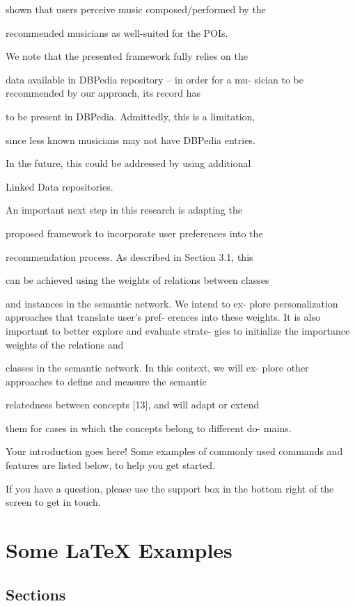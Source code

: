 \documentclass[paper=a4, fontsize=11pt]{scrartcl}
\begin{document}
shown that users perceive music composed/performed by the

recommended musicians as well-suited for the POIs.

We note that the presented framework fully relies on the

data available in DBPedia repository – in order for a mu-
sician to be recommended by our approach, its record has

to be present in DBPedia. Admittedly, this is a limitation,

since less known musicians may not have DBPedia entries.

In the future, this could be addressed by using additional

Linked Data repositories.

An important next step in this research is adapting the

proposed framework to incorporate user preferences into the

recommendation process. As described in Section 3.1, this

can be achieved using the weights of relations between classes

and instances in the semantic network. We intend to ex-
plore personalization approaches that translate user’s pref-
erences into these weights.
It is also important to better explore and evaluate strate-
gies to initialize the importance weights of the relations and

classes in the semantic network. In this context, we will ex-
plore other approaches to define and measure the semantic

relatedness between concepts [13], and will adapt or extend

them for cases in which the concepts belong to different do-
mains.

Your introduction goes here! Some examples of commonly used commands and features are listed below, to help you get started.

If you have a question, please use the support box in the bottom right of the screen to get in touch. 

\section{Some \LaTeX{} Examples}
\label{sec:examples}

\subsection{Sections}
\end{document}

